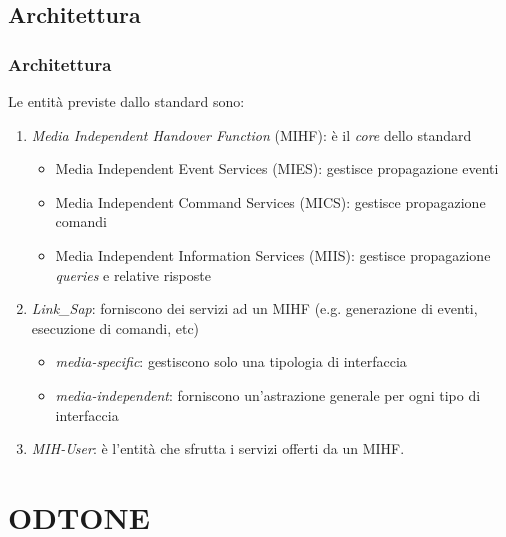 \documentclass[10pt]{beamer}
\begin{document}
\subsection{Architettura}
\begin{frame}
\frametitle{Architettura}
Le entità previste dallo standard sono:
\begin{enumerate}
\item {\em Media Independent Handover Function} (MIHF): è il {\em core} dello standard
\begin{itemize}
\item Media Independent Event Services (MIES): gestisce propagazione eventi
\item Media Independent Command Services (MICS): gestisce propagazione comandi
\item Media Independent Information Services (MIIS): gestisce propagazione {\em queries} e relative risposte
\end{itemize}

\item {\em Link\_Sap}: forniscono dei servizi ad un MIHF (e.g. generazione di eventi, esecuzione di comandi, etc)
\begin{itemize}
\item {\em media-specific}: gestiscono solo una tipologia di interfaccia
\item {\em media-independent}: forniscono un'astrazione generale per ogni tipo di interfaccia
\end{itemize}

\item {\em MIH-User}: è l'entità che sfrutta i servizi offerti da un MIHF.

\end{enumerate}
\end{frame}

\section{ODTONE}
\end{document}
